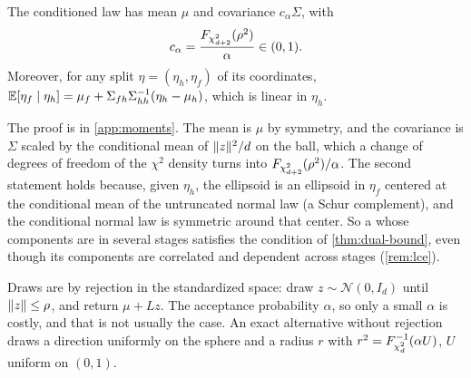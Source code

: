 \begin{proposition}
\label{prop:confidence-moments}
The conditioned law has mean $\mu$ and covariance $c_\alpha\Sigma$, with
\[
c_\alpha = \frac{F_{\chi^2_{d+2}}(\rho^2)}{\alpha} \in (0, 1).
\]
Moreover, for any split $\eta = (\eta_h, \eta_f)$ of its coordinates,
$\mathbb{E}[\eta_f \mid \eta_h] = \mu_f + \Sigma_{fh}\Sigma_{hh}^{-1}(\eta_h - \mu_h)$, which is linear in $\eta_h$.
\end{proposition}

The proof is in \cref{app:moments}.
The mean is $\mu$ by symmetry, and the covariance is $\Sigma$ scaled by the conditional mean of $\lVert z \rVert^2/d$ on the ball,
which a change of degrees of freedom of the $\chi^2$ density turns into $F_{\chi^2_{d+2}}(\rho^2)/\alpha$.
The second statement holds because, given $\eta_h$, the ellipsoid is an ellipsoid in $\eta_f$ centered at the conditional mean of the untruncated normal law (a Schur complement),
and the conditional normal law is symmetric around that center.
So a  whose components are in several stages satisfies the condition of \cref{thm:dual-bound},
even though its components are correlated and dependent across stages (\cref{rem:lce}).

Draws are by rejection in the standardized space:
draw $z \sim \mathcal{N}(0, I_d)$ until $\lVert z \rVert \le \rho$, and return $\mu + Lz$.
The acceptance probability $\alpha$,
so only a small $\alpha$ is costly, and that is not usually the case.
An exact alternative without rejection draws a direction uniformly on the sphere
and a radius $r$ with $r^2 = F_{\chi^2_{d}}^{-1}(\alpha U)$, $U$ uniform on $(0,1)$.

